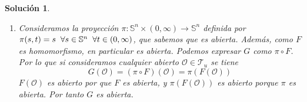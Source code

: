 \documentclass{article}
\theoremstyle{remark,bold} \newtheorem{exercise}{Ejercicio}
\newtheorem*{solution}{Solución}
\begin{document}
\begin{solution}
\begin{enumerate}
    \[F^{-1}(F(x)) = F^{-1}\bigg(\frac{x}{\|x\|},\|x\|\bigg) = \|x\|
      \frac{x}{\|x\|} = x \]

    Con esto hemos probado que $F$ tiene inversa, por lo que es
    biyectiva. Obviamente, $F^{-1}$ es continua, por lo que $F$ es una
    biyección continua con inversa continua, un homeomorfismo de
    $(\mathbb{R}^{n+1} \backslash \{0\}, \mathcal{T}_u)$ sobre
    $(\mathbb{S}^n \times (0, \infty), \mathcal{T}_u \times
    \mathcal{T}_u)$.

  \item Consideramos la proyección $\pi : \mathbb{S}^n \times (0,
    \infty) \longrightarrow \mathbb{S}^n$ definida por $\pi(s,t) = s
    \hspace{2mm} \forall s \in \mathbb{S}^n \hspace{2mm} \forall t \in (0,
    \infty)$, que sabemos que es abierta. Además, como $F$ es
    homomorfismo, en particular es abierta. Podemos expresar $G$ como $\pi
    \circ F$. Por lo que si consideramos cualquier abierto
    $\mathcal{\mathcal{\mathcal{O}}} \in \mathcal{T}_u$ se tiene
    \[G(\mathcal{\mathcal{O}}) = (\pi \circ F)(\mathcal{\mathcal{O}})
      = \pi(F(\mathcal{\mathcal{O}}))\] $F(\mathcal{\mathcal{O}})$ es
    abierto por que $F$ es abierta, y $\pi(F(\mathcal{\mathcal{O}}))$ es
    abierto porque $\pi$ es abierta. Por tanto $G$ es abierta.
    
  \end{enumerate}
  
\end{solution}
\end{document}
